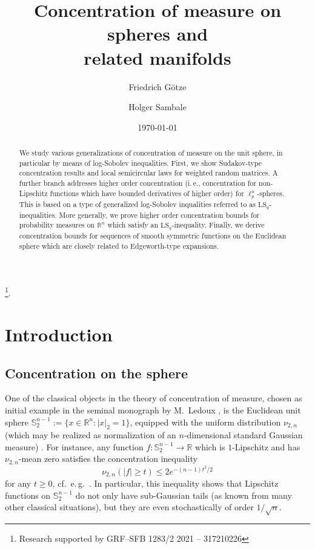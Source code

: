 \documentclass[a4paper,12pt]{amsart}
\title[Concentration on spheres]{Concentration of measure on spheres and\\ related manifolds}
\author{Friedrich G\"{o}tze}
\author{Holger Sambale}
\numberwithin{equation}{section}
\theoremstyle{remark}
\def\R{{\mathbb R}}
\def\S{{\mathbb S}}
\begin{document}
\begin{abstract}
    We study various generalizations of concentration of measure on the unit sphere, in particular by means of log-Sobolev inequalities. First, we show Sudakov-type concentration results and local semicircular laws for weighted random matrices. A further branch addresses higher order concentration (i.\,e., concentration for non-Lipschitz functions which have bounded derivatives of higher order) for $\ell_p^n$-spheres. This is based on a type of generalized log-Sobolev inqualities referred to as $\mathrm{LS}_q$-inequalities. More generally, we prove higher order concentration bounds for probability measures on $\R^n$ which satisfy an $\mathrm{LS}_q$-inequality. Finally, we derive concentration bounds for sequences of smooth symmetric functions on the Euclidean sphere which are closely related to Edgeworth-type expansions.
\end{abstract}

\thanks{Research  supported by GRF--SFB 1283/2 2021 -- 317210226}.

\date{\today}

\maketitle

\section{Introduction}

\subsection{Concentration on the sphere}
One of the classical objects in the theory of concentration of measure, chosen as initial example in the seminal monograph by M.\ Ledoux \cite{Led01}, is the Euclidean unit sphere $\S_2^{n-1} := \{x \in \R^n \colon |x|_2 = 1\}$, equipped with the uniform distribution $\nu_{2,n}$ (which may be realized as normalization of an $n$-dimensional standard Gaussian measure) . For instance, any function $f \colon \S_2^{n-1} \to \R$ which is $1$-Lipschitz and has $\nu_{2,n}$-mean zero satisfies the concentration inequality
\begin{equation}\label{LipschitzSph}
\nu_{2,n}(|f| \ge t) \le 2e^{-(n-1)t^2/2}
\end{equation}
for any $t \ge 0$, cf.\ e.\,g.\ \cite[Prop.\ 10.3.1]{BCG23}. In particular, this inequality shows that Lipschitz functions on $\S_2^{n-1}$ do not only have sub-Gaussian tails (as known from many other classical situations), but they are even stochastically of order $1/\sqrt{n}$.
\end{document}
